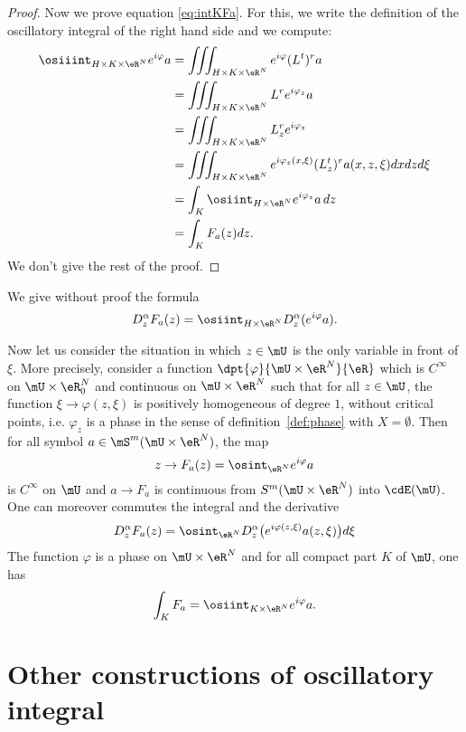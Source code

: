 \begin{proof}
	Now we prove equation \eqref{eq:intKFa}. For this, we write the definition of the oscillatory integral of the right hand side and we compute:
	\begin{equation}
		\begin{split}
			\osiiint_{H\times K\times\eR^N}e^{i\varphi}a	&=\iiint_{H\times K\times\eR^N}e^{i\varphi}(L^t)^ra \\
			&=\iiint_{H\times K\times\eR^N}L^re^{i\varphi_z}a\\
			&=\iiint_{H\times K\times\eR^N}L_z^re^{i\varphi_z}\\
			&=\iiint_{H\times K\times\eR^N}e^{i\varphi_z(x,\xi)}(L_z^t)^ra(x,z,\xi)dxdzd\xi\\
			&=\int_K\osiint_{H\times\eR^N}e^{i\varphi_z}a\,dz\\
			&=\int_KF_a(z)dz.
		\end{split}
	\end{equation}
	We don't give the rest of the proof.

\end{proof}

We give without proof the formula
\begin{equation}
	D_z^{\alpha}F_a(z)=\osiint_{H\times\eR^N}D_z^{\alpha}(e^{i\varphi}a).
\end{equation}

Now let us consider the situation in which $z\in\mU$ is the only variable in front of $\xi$. More precisely, consider a function $\dpt{\varphi}{\mU\times\eR^N}{\eR}$ which is $C^{\infty}$ on $\mU\times\eR^N_0$ and continuous on $\mU\times\eR^N$ such that for all $z\in\mU$, the function $\xi\to\varphi(z,\xi)$ is positively homogeneous of degree $1$, without critical points, i.e. $\varphi_z$ is a phase in the sense of definition~\ref{def:phase} with $X=\emptyset$. Then for all symbol $a\in\mS^m(\mU\times\eR^N)$, the map
\[
	z\to F_a(z)=\osint_{\eR^N}e^{i\varphi}a
\]
is $C^{\infty}$ on $\mU$ and  $a\to F_a$ is continuous from $S^m(\mU\times\eR^N)$ into $\cdE(\mU)$. One can moreover commutes the integral and the derivative
\[
	D_z^{\alpha}F_a(z)=\osint_{\eR^N}D^{\alpha}_z\big( e^{i\varphi(z,\xi)}a(z,\xi) \big)d\xi
\]
The function $\varphi$ is a phase on $\mU\times\eR^N$ and for all compact part $K$ of $\mU$, one has
\[
	\int_KF_a=\osiint_{K\times\eR^N}e^{i\varphi}a.
\]

\section{Other constructions of oscillatory integral}

